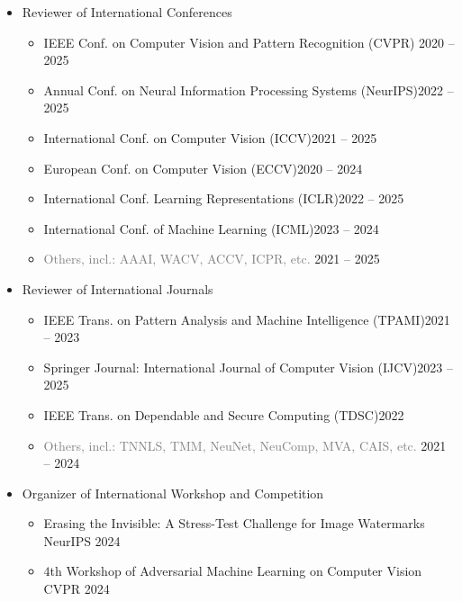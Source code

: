\documentclass[10pt,margin,line,pifont,palatino,courier]{res}
\begin{document}
\begin{resume}
\begin{itemize}[leftmargin=*]
\item Reviewer of International Conferences
    \begin{itemize}[noitemsep, leftmargin=*]
        \item[$\circ$] IEEE Conf. on Computer Vision and Pattern Recognition (CVPR) \hfill 2020 -- 2025
        \item[$\circ$] Annual Conf. on Neural Information Processing Systems (NeurIPS)\hfill 2022 -- 2025
        \item[$\circ$] International Conf. on Computer Vision (ICCV)\hfill 2021 -- 2025
        \item[$\circ$] European Conf. on Computer Vision (ECCV)\hfill 2020 -- 2024
        \item[$\circ$] International Conf. Learning Representations (ICLR)\hfill 2022 -- 2025
        \item[$\circ$] International Conf. of Machine Learning (ICML)\hfill 2023 -- 2024
        \item[$\circ$] \textcolor{gray}{Others, incl.: AAAI, WACV, ACCV, ICPR, etc.} \hfill 2021 -- 2025
    \end{itemize}
\item Reviewer of International Journals
    \begin{itemize}[noitemsep, leftmargin=*]
        \item[$\circ$] IEEE Trans. on Pattern Analysis and Machine Intelligence (TPAMI)\hfill 2021 -- 2023
        \item[$\circ$] Springer Journal: International Journal of Computer Vision (IJCV)\hfill 2023 -- 2025
        \item[$\circ$] IEEE Trans. on Dependable and Secure Computing (TDSC)\hfill 2022
        \item[$\circ$] \textcolor{gray}{Others, incl.: TNNLS, TMM, NeuNet, NeuComp, MVA, CAIS, etc.} \hfill 2021 -- 2024
    \end{itemize}
\item Organizer of International Workshop and Competition
    \begin{itemize}[noitemsep, leftmargin=*]
        \item[$\circ$] Erasing the Invisible: A Stress-Test Challenge for Image Watermarks \hfill NeurIPS 2024
\reversemarginpar{}
        \item[$\circ$] $4$th Workshop of Adversarial Machine Learning on Computer Vision \hfill CVPR 2024

\end{itemize}
\end{itemize}
\end{resume}
\end{document}
